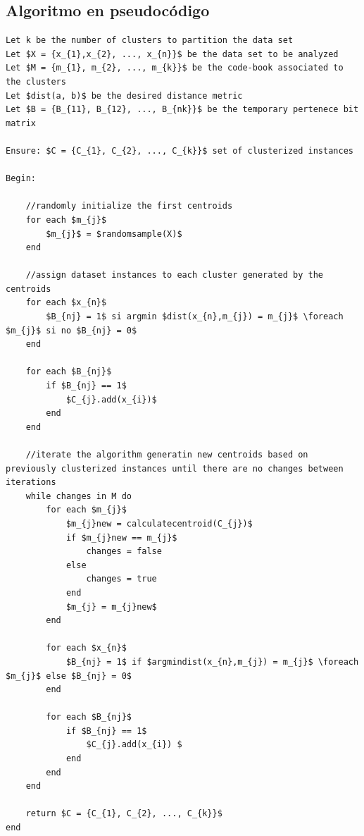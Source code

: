 \documentclass[10pt,a4paper]{article}
\begin{document}


\newpage

\subsection{Algoritmo en pseudocódigo}

\begin{lstlisting}[mathescape=true]
Let k be the number of clusters to partition the data set
Let $X = {x_{1},x_{2}, ..., x_{n}}$ be the data set to be analyzed
Let $M = {m_{1}, m_{2}, ..., m_{k}}$ be the code-book associated to the clusters
Let $dist(a, b)$ be the desired distance metric
Let $B = {B_{11}, B_{12}, ..., B_{nk}}$ be the temporary pertenece bit matrix

Ensure: $C = {C_{1}, C_{2}, ..., C_{k}}$ set of clusterized instances

Begin:

	//randomly initialize the first centroids
	for each $m_{j}$
		$m_{j}$ = $randomsample(X)$
	end
	
	//assign dataset instances to each cluster generated by the centroids
	for each $x_{n}$
		$B_{nj} = 1$ si argmin $dist(x_{n},m_{j}) = m_{j}$ \foreach $m_{j}$ si no $B_{nj} = 0$ 
	end
		
	for each $B_{nj}$
		if $B_{nj} == 1$
			$C_{j}.add(x_{i})$ 
		end
	end
	
	//iterate the algorithm generatin new centroids based on previously clusterized instances until there are no changes between iterations
	while changes in M do
		for each $m_{j}$
			$m_{j}new = calculatecentroid(C_{j})$
			if $m_{j}new == m_{j}$
				changes = false
			else
				changes = true
			end
			$m_{j} = m_{j}new$	
		end
		
		for each $x_{n}$
			$B_{nj} = 1$ if $argmindist(x_{n},m_{j}) = m_{j}$ \foreach $m_{j}$ else $B_{nj} = 0$
		end
		
		for each $B_{nj}$
			if $B_{nj} == 1$
				$C_{j}.add(x_{i}) $
			end
		end
	end
	
	return $C = {C_{1}, C_{2}, ..., C_{k}}$
end

\end{lstlisting}
\end{document}
